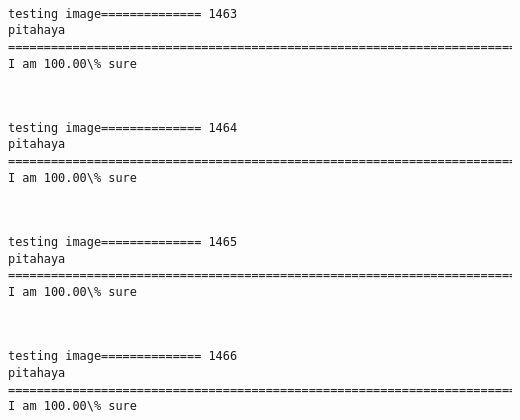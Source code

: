 \documentclass[11pt]{article}
\begin{document}
    \begin{center}
    \end{center}
    { \hspace*{\fill} \\}
    
    \begin{Verbatim}[commandchars=\\\{\}]
testing image============== 1463
pitahaya
============================================================================
I am 100.00\% sure

    \end{Verbatim}

    \begin{center}
    \end{center}
    { \hspace*{\fill} \\}
    
    \begin{Verbatim}[commandchars=\\\{\}]
testing image============== 1464
pitahaya
============================================================================
I am 100.00\% sure

    \end{Verbatim}

    \begin{center}
    \end{center}
    { \hspace*{\fill} \\}
    
    \begin{Verbatim}[commandchars=\\\{\}]
testing image============== 1465
pitahaya
============================================================================
I am 100.00\% sure

    \end{Verbatim}

    \begin{center}
    \end{center}
    { \hspace*{\fill} \\}
    
    \begin{Verbatim}[commandchars=\\\{\}]
testing image============== 1466
pitahaya
============================================================================
I am 100.00\% sure

    \end{Verbatim}
\end{document}
